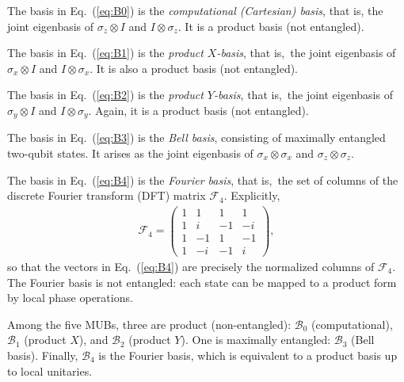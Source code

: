 \documentclass[%
  reprint,
  superscriptaddress,
  showpacs,
  showkeys,
  amsmath,amssymb,
  pra,
  longbibliography,
  floatfix,
  x11names
]{revtex4-2}
\begin{document}
The basis in Eq.~(\ref{eq:B0}) is the \textit{computational (Cartesian) basis}, that is, the joint eigenbasis of
\(\sigma_z\otimes I\) and \(I\otimes\sigma_z\).
It is a product basis (not entangled).

The basis in Eq.~(\ref{eq:B1}) is the \textit{product \(X\)-basis}, that is,\ the joint eigenbasis of
\(\sigma_x\otimes I\) and \(I\otimes\sigma_x\).
It is also a product basis (not entangled).

The basis in Eq.~(\ref{eq:B2}) is the \textit{product \(Y\)-basis}, that is,\ the joint eigenbasis of
\(\sigma_y\otimes I\) and \(I\otimes\sigma_y\).
Again, it is a product basis (not entangled).

The basis in Eq.~(\ref{eq:B3}) is the \textit{Bell basis}, consisting of maximally entangled two-qubit states.
It arises as the joint eigenbasis of \(\sigma_x\otimes\sigma_x\) and \(\sigma_z\otimes\sigma_z\).

The basis in Eq.~(\ref{eq:B4}) is the \textit{Fourier basis}, that is,\ the set of columns of the discrete Fourier transform (DFT) matrix \(\mathcal{F}_4\).
Explicitly,
\begin{align}
\mathcal{F}_4 =
\begin{pmatrix}
1 & 1 & 1 & 1 \\
1 & i & -1 & -i \\
1 & -1 & 1 & -1 \\
1 & -i & -1 & i
\end{pmatrix},
\label{eq:FourierMatrix}
\end{align}
so that the vectors in Eq.~(\ref{eq:B4}) are precisely the normalized columns of \(\mathcal{F}_4\).
The Fourier basis is not entangled: each state can be mapped to a product form by local phase operations.


Among the five MUBs, three are product (non-entangled): \(\mathcal{B}_0\) (computational), \(\mathcal{B}_1\) (product \(X\)), and \(\mathcal{B}_2\) (product \(Y\)).
One is maximally entangled: \(\mathcal{B}_3\) (Bell basis).
Finally, \(\mathcal{B}_4\) is the Fourier basis, which is equivalent to a product basis up to local unitaries.
\end{document}
